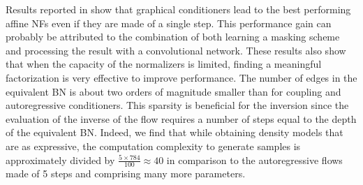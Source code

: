 Results reported in  show that graphical conditioners lead to the best performing affine NFs even if they are made of a single step. 
This performance gain can probably be attributed to the combination of both learning a masking scheme and processing the result with a convolutional network.
These results also show that when the capacity of the normalizers is limited, finding a meaningful factorization is very effective to improve performance. The number of edges in the equivalent BN is about two orders of magnitude smaller than for coupling and autoregressive conditioners. This sparsity is beneficial for the inversion since the evaluation of the inverse of the flow requires a number of steps equal to the depth \citep{depth-dag} of the equivalent BN. 
Indeed, we find that while obtaining density models that are as expressive, the computation complexity to generate samples is approximately divided by $\frac{5\times 784}{100} \approx 40 $ in comparison to the autoregressive flows made of 5 steps and comprising many more parameters. 


